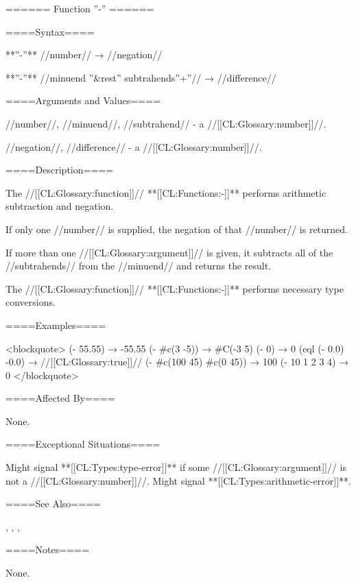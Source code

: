 ====== Function ''-'' ======

====Syntax====

**{''-''}** //number// → //negation//

**{''-''}** //minuend ''&rest'' subtrahends''+''// → //difference//

====Arguments and Values====

//number//, //minuend//, //subtrahend// - a //[[CL:Glossary:number]]//.

//negation//, //difference// - a //[[CL:Glossary:number]]//.

====Description====

The //[[CL:Glossary:function]]// **[[CL:Functions:-]]** performs arithmetic subtraction and negation.

If only one //number// is supplied, the negation of that //number// is returned.

If more than one //[[CL:Glossary:argument]]// is given, it subtracts all of the //subtrahends// from the //minuend// and returns the result.

The //[[CL:Glossary:function]]// **[[CL:Functions:-]]** performs necessary type conversions.

====Examples====

<blockquote> (- 55.55) → -55.55 (- #c(3 -5)) → #C(-3 5) (- 0) → 0 (eql (- 0.0) -0.0) → //[[CL:Glossary:true]]// (- #c(100 45) #c(0 45)) → 100 (- 10 1 2 3 4) → 0 </blockquote>

====Affected By====

None.

====Exceptional Situations====

Might signal **[[CL:Types:type-error]]** if some //[[CL:Glossary:argument]]// is not a //[[CL:Glossary:number]]//. Might signal **[[CL:Types:arithmetic-error]]**.

====See Also====

{\secref\NumericOperations}, {\secref\RationalComputations}, {\secref\FloatingPointComputations}, {\secref\ComplexComputations}

====Notes====

None.

